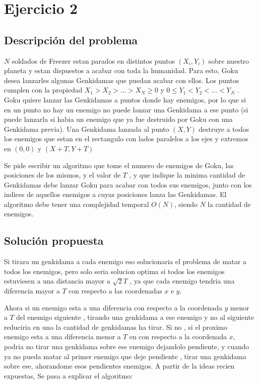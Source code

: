 
\section{Ejercicio 2}
    \subsection{Descripción del problema}
        $N$ soldados de Freezer estan parados en distintos puntos $(X_i,Y_i)$ sobre nuestro planeta y estan dispuestos a acabar con toda la humanidad. Para esto, Goku desea lanzarles algunas Genkidamas que puedan acabar con ellos. Los puntos cumplen con la propiedad $ X_1 > X_2 >. . . > X_N \geq 0 $ y $ 0 \leq Y_1 < Y_2 < . . . < Y_N$ . Goku quiere lanzar las Genkidamas a puntos donde hay enemigos, por lo que si en un punto no hay un enemigo no puede lanzar una Genkidama a ese punto (si puede lanzarla si habia un enemigo que ya fue destruido por Goku con una Genkidama previa). Una Genkidama lanzada al punto $(X,Y)$ destruye a todos los enemigos que estan en el rectangulo con lados paralelos a los ejes y extremos en $(0, 0)$ y $(X + T, Y + T )$

        Se pide escribir un algoritmo que tome el numero de enemigos de Goku, las posiciones de los mismos, y el valor de $T$ , y que indique la minima cantidad de Genkidamas debe lanzar Goku para acabar con todos sus enemigos, junto con los  indices de aquellos enemigos a cuyas posiciones lanza las Genkidamas. El algoritmo debe tener una complejidad temporal $O(N)$, siendo $N$ la cantidad de enemigos.

    \subsection{Solución propuesta}
        Si tirara un genkidama a cada enemigo eso solucionaria el problema de matar a todos los enemigos, pero solo seria solucion optima si todos los enemigos estuviesen a una distancia mayor a $\sqrt{2}T$ , ya que cada enemigo tendria una diferencia mayor a $T$ con respecto a las coordenadas $x$ e $y$. 

        Ahora si un enemigo esta a una diferencia con respecto a la coordenada $y$ menor a $T$ del enemigo siguiente , tirando una genkidama a ese enemigo y no al siguiente reduciria en uno la cantidad de genkidamas ha tirar. Si no , si el proximo enemigo esta a una diferencia menor a $T$ en con respecto a la coordenada $x$, podria no tirar una genkidama sobre ese enemigo dejandolo pendiente, y cuando ya no pueda matar al primer enemigo que deje pendiente , tirar una genkidama sobre ese, ahorandome esos pendientes enemigos. A partir de la ideas recien expuestas, Se pasa a explicar el algoritmo:  


